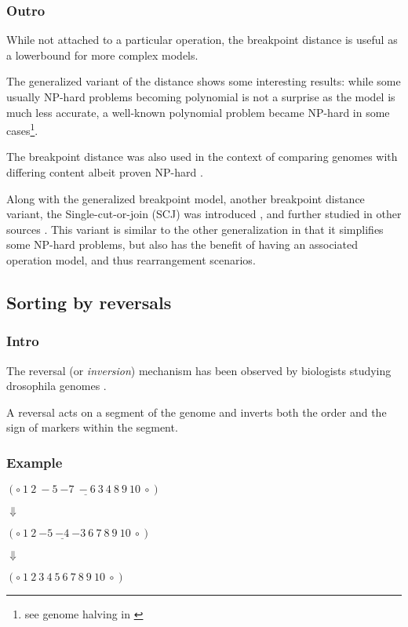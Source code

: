 \documentclass[11pt,final,twoside,nofrench]{thlifl}
\newcommand{\mfst}[1]{ \ensuremath{{- #1}} }
\begin{document}
\subsubsection*{Outro}

While not attached to a particular operation, the breakpoint distance is useful as a lowerbound for more complex models.

The generalized variant of the distance shows some interesting results: while some usually NP-hard problems becoming polynomial is not a surprise as the model is much less accurate, a well-known polynomial problem became NP-hard in some cases\footnote{see genome halving in \cite{K11}}.

The breakpoint distance was also used in the context of comparing genomes with differing content albeit proven NP-hard \cite{BFC04}.

Along with the generalized breakpoint model, another breakpoint distance variant, the Single-cut-or-join (SCJ) was introduced  \cite{FM09} \cite{FM11} \cite{BFM13}, and further studied in other sources \cite{SCJ1} \cite{SCJ2}. This variant is similar to the other generalization in that it simplifies some NP-hard problems, but also has the benefit of having an associated operation model, and thus rearrangement scenarios.

\subsection{Sorting by reversals}

\subsubsection*{Intro}

The reversal (or \emph{inversion}) mechanism has been observed by biologists studying drosophila genomes \cite{SD36} \cite{SD38}.

A reversal acts on a segment of the genome and inverts both the order and the sign of markers within the segment.

\subsubsection*{Example}

\begin{center}
$(\circ~1~2~-5~\underline{-7~-6~3~4}~8~9~10~\circ)$

$\Downarrow$

$(\circ~1~2~\underline{\mfst{5}~\mfst{4}~\mfst{3}}~6~7~8~9~10~\circ)$

$\Downarrow$

$(\circ~1~2~3~4~5~6~7~8~9~10~\circ)$

\end{center}
\end{document}
